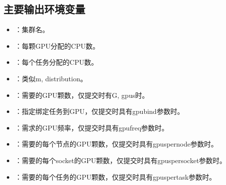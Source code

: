 \documentclass[a4paper,12pt,english]{sphinxmanual}
\begin{document}
\subsection{主要输出环境变量}
\label{\detokenize{slurm/slurm:id34}}\label{\detokenize{slurm/slurm:id35}}\begin{itemize}
\item {} 
\sphinxAtStartPar
{}：集群名。

\item {} 
\sphinxAtStartPar
{}：每颗GPU分配的CPU数。

\item {} 
\sphinxAtStartPar
{}：每个任务分配的CPU数。

\item {} 
\sphinxAtStartPar
{}：类似\sphinxhyphen{}m, \sphinxhyphen{}\sphinxhyphen{}distribution。

\item {} 
\sphinxAtStartPar
{}：需要的GPU颗数，仅提交时有\sphinxhyphen{}G, \sphinxhyphen{}\sphinxhyphen{}gpus时。

\item {} 
\sphinxAtStartPar
{}：指定绑定任务到GPU，仅提交时具有\sphinxhyphen{}\sphinxhyphen{}gpu\sphinxhyphen{}bind参数时。

\item {} 
\sphinxAtStartPar
{}：需求的GPU频率，仅提交时具有\sphinxhyphen{}\sphinxhyphen{}gpu\sphinxhyphen{}freq参数时。

\item {} 
\sphinxAtStartPar
{}：需要的每个节点的GPU颗数，仅提交时具有\sphinxhyphen{}\sphinxhyphen{}gpus\sphinxhyphen{}per\sphinxhyphen{}node参数时。

\item {} 
\sphinxAtStartPar
{}：需要的每个socket的GPU颗数，仅提交时具有\sphinxhyphen{}\sphinxhyphen{}gpus\sphinxhyphen{}per\sphinxhyphen{}socket参数时。

\item {} 
\sphinxAtStartPar
{}：需要的每个任务的GPU颗数，仅提交时具有\sphinxhyphen{}\sphinxhyphen{}gpus\sphinxhyphen{}per\sphinxhyphen{}task参数时。


\end{itemize}
\end{document}
